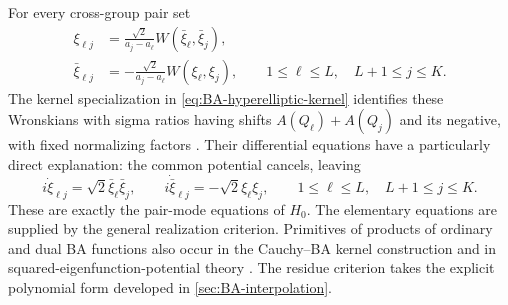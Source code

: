 For every cross-group pair set
\begin{equation}\label{eq:BA-pair-composites}
\begin{aligned}
 \xi_{\ell j}
 &=\frac{\sqrt2}{a_j-a_{\ell}}
        W(\bar{\xi}_{\ell},\bar{\xi}_j),\\
 \bar{\xi}_{\ell j}
 &=-\frac{\sqrt2}{a_j-a_{\ell}}
        W(\xi_{\ell},\xi_j),
 \qquad 1\leq\ell\leq L,\quad L+1\leq j\leq K.
\end{aligned}
\end{equation}
The kernel specialization in \cref{eq:BA-hyperelliptic-kernel} identifies these Wronskians with
sigma ratios having shifts $A(Q_{\ell})+A(Q_j)$ and its negative,
with fixed normalizing factors
\cite[Theorem~6.2, $n=2$]{Nakayashiki2026}. Their differential equations have
a particularly direct explanation: the common potential cancels,
leaving
\begin{equation}\label{eq:BA-pair-rates}
 i\dot\xi_{\ell j}=\sqrt2\bar{\xi}_{\ell}\bar{\xi}_j,
 \qquad
 i\dot{\bar{\xi}}_{\ell j}=-\sqrt2\xi_{\ell}\xi_j,
 \qquad1\leq\ell\leq L,\quad L+1\leq j\leq K.
\end{equation}
These are exactly the pair-mode equations of $H_0$. The elementary equations are supplied by the general realization criterion.
Primitives of products of ordinary and dual BA functions also occur in
the Cauchy--BA kernel construction
\cite[Section~2.4, equation~(2.13)]{GrinevichOrlov1989} and in
squared-eigenfunction-potential theory
\cite[Corollary~3.1]{AratynNissimovPacheva1997}.
The residue criterion takes the explicit polynomial form developed in
\cref{sec:BA-interpolation}.

